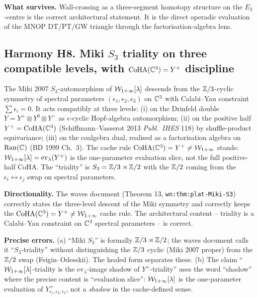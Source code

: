 \textbf{What survives.} Wall-crossing as a three-segment homotopy
structure on the $E_2$-centre is the correct architectural statement.
It is the direct operadic evaluation of the MNOP DT/PT/GW triangle
through the factorisation-algebra lens.

\subsection{Harmony H8. Miki $S_3$ triality on three compatible levels,
with $\mathrm{CoHA}(\mathbb{C}^3) = Y^+$ discipline}
\label{wn:subsec:H8-miki}

\begin{theorem}\ClaimStatusDirectionallyCorrect
\label{wn:thm:H8-miki}
The Miki 2007 $S_3$-automorphism of $\mathcal{W}_{1+\infty}[\lambda]$ descends from the
$\mathbb{Z}/3$-cyclic symmetry of spectral parameters $(\epsilon_1, \epsilon_2,
\epsilon_3)$ on $\mathbb{C}^3$ with Calabi--Yau constraint
$\sum \epsilon_i = 0$. It acts compatibly at three levels:
(i) on the Drinfeld double $Y = Y^+ \otimes Y^0 \otimes Y^-$ as
$\epsilon$-cyclic Hopf-algebra automorphism; (ii) on the positive half
$Y^+ = \mathrm{CoHA}(\mathbb{C}^3)$ (Schiffmann--Vasserot 2013 \emph{Publ.~IHES} 118)
by shuffle-product equivariance; (iii) on the coalgebra dual,
realised as a factorisation algebra on $\mathrm{Ran}(\mathbb{C})$ (BD 1999
Ch.~3). The cache rule $\mathrm{CoHA}(\mathbb{C}^3) = Y^+ \ne \mathcal{W}_{1+\infty}$ stands:
$\mathcal{W}_{1+\infty}[\lambda] = \mathrm{ev}_\lambda(Y^+)$ is the one-parameter
evaluation slice, not the full positive-half CoHA. The
``triality'' is $S_3 = \mathbb{Z}/3 \rtimes \mathbb{Z}/2$ with the $\mathbb{Z}/2$ coming from
the $\epsilon_i \leftrightarrow \epsilon_j$ swap on spectral parameters.
\end{theorem}

\textbf{Directionality.} The waves document (Theorem 13,
\verb|wn:thm:plat-Miki-S3|) correctly states the three-level descent of
the Miki symmetry and correctly keeps the $\mathrm{CoHA}(\mathbb{C}^3) = Y^+ \ne \mathcal{W}_{1+\infty}$
cache rule. The architectural content -- triality is a Calabi--Yau
constraint on $\mathbb{C}^3$ spectral parameters -- is correct.

\textbf{Precise errors.} (a) ``Miki $S_3$'' is formally $\mathbb{Z}/3 \rtimes \mathbb{Z}/2$;
the waves document calls it ``$S_3$-triality'' without distinguishing
the $\mathbb{Z}/3$ cyclic (Miki 2007 proper) from the $\mathbb{Z}/2$ swap
(Feigin--Odesskii). The healed form separates these. (b) The claim
``$\mathcal{W}_{1+\infty}[\lambda]$-triality is the $\mathrm{ev}_\lambda$-image shadow of
$Y^+$-triality'' uses the word ``shadow'' where the precise
content is ``evaluation slice'': $\mathcal{W}_{1+\infty}[\lambda]$ is the one-parameter
evaluation of $Y^+_{\epsilon_1, \epsilon_2, \epsilon_3}$, not a
\emph{shadow} in the cache-defined sense.

